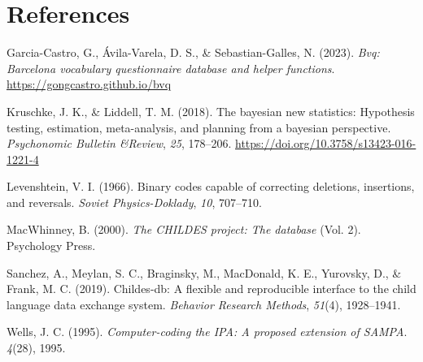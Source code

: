\documentclass[
]{article}
\newlength{\cslhangindent}
\newlength{\cslentryspacingunit} %
\newenvironment{CSLReferences}[2] %
 {%
  \setlength{\parindent}{0pt}
  \ifodd #1
  \let\oldpar\par
  \def\par{\hangindent=\cslhangindent\oldpar}
  \fi
  \setlength{\parskip}{#2\cslentryspacingunit}
 }%
 {}
\begin{document}
\newpage{}

\hypertarget{references}{%
\section*{References}\label{references}}

\hypertarget{refs}{}
\begin{CSLReferences}{1}{0}
\leavevmode{}%
Garcia-Castro, G., Ávila-Varela, D. S., \& Sebastian-Galles, N. (2023).
\emph{Bvq: Barcelona vocabulary questionnaire database and helper
functions}. \url{https://gongcastro.github.io/bvq}

\leavevmode{}%
Kruschke, J. K., \& Liddell, T. M. (2018). The bayesian new statistics:
Hypothesis testing, estimation, meta-analysis, and planning from a
bayesian perspective. \emph{Psychonomic Bulletin \&Review}, \emph{25},
178--206. \url{https://doi.org/10.3758/s13423-016-1221-4}

\leavevmode{}%
Levenshtein, V. I. (1966). Binary codes capable of correcting deletions,
insertions, and reversals. \emph{Soviet Physics-Doklady}, \emph{10},
707--710.

\leavevmode{}%
MacWhinney, B. (2000). \emph{The {CHILDES} project: The database} (Vol.
2). Psychology Press.

\leavevmode{}%
Sanchez, A., Meylan, S. C., Braginsky, M., MacDonald, K. E., Yurovsky,
D., \& Frank, M. C. (2019). Childes-db: A flexible and reproducible
interface to the child language data exchange system. \emph{Behavior
Research Methods}, \emph{51}(4), 1928--1941.

\leavevmode{}%
Wells, J. C. (1995). \emph{Computer-coding the {IPA}: A proposed
extension of {SAMPA}}. \emph{4}(28), 1995.

\end{CSLReferences}
\end{document}
